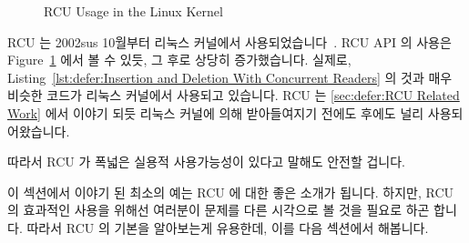 \begin{figure}[tb]
\centering
{}
\caption{RCU Usage in the Linux Kernel}
\label{fig:defer:RCU Usage in the Linux Kernel}
\end{figure}

RCU 는 2002sus 10월부터 리눅스 커널에서 사용되었습니다~\cite{Torvalds2.5.43}.
RCU API 의 사용은
Figure~\ref{fig:defer:RCU Usage in the Linux Kernel}
에서 볼 수 있듯, 그 후로 상당히 증가했습니다.
실제로,
Listing~\ref{lst:defer:Insertion and Deletion With Concurrent Readers}
의 것과 매우 비슷한 코드가 리눅스 커널에서 사용되고 있습니다.
RCU 는
\cref{sec:defer:RCU Related Work}
에서 이야기 되듯 리눅스 커널에 의해 받아들여지기 전에도 후에도 널리
사용되어왔습니다.

따라서 RCU 가 폭넓은 실용적 사용가능성이 있다고 말해도 안전할 겁니다.

이 섹션에서 이야기 된 최소의 예는 RCU 에 대한 좋은 소개가 됩니다.
하지만, RCU 의 효과적인 사용을 위해선 여러분이 문제를 다른 시각으로 볼 것을
필요로 하곤 합니다.
따라서 RCU 의 기본을 알아보는게 유용한데, 이를 다음 섹션에서 해봅니다.

